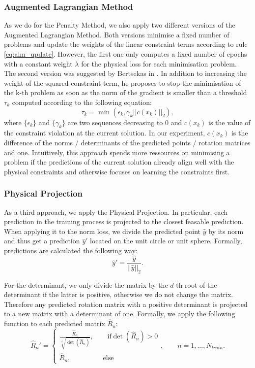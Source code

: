 \subsubsection{Augmented Lagrangian Method}
\label{exp:alm}
As we do for the Penalty Method, we also apply two different versions of the Augmented Lagrangian Method. Both versions minimise a fixed number of problems and update the weights of the linear constraint terms according to rule \eqref{eq:alm_update}. However, the first one only computes a fixed number of epochs with a constant weight $\lambda$ for the physical loss for each minimisation problem.\\
\indent The second version was suggested by Bertsekas in \cite{Yurkiewicz1985ConstrainedOA}. In addition to increasing the weight of the squared constraint term, he proposes to stop the minimisation of the k-th problem as soon as the norm of the gradient is smaller than a threshold $\tau_k$ computed according to the following equation:
\[\tau_k = \min(\epsilon_k, \gamma_k ||c(x_k)||_2), \]
where $\{\epsilon_k\}$ and $\{\gamma_k \}$ are two sequences decreasing to 0 and $c(x_k)$ is the value of the constraint violation at the current solution. In our experiment, $c(x_k)$ is the difference of the norms / determinants of the predicted points / rotation matrices and one. Intuitively, this approach spends more ressources on minimising a problem if the predictions of the current solution already align well with the physical constraints and otherwise focuses on learning the constraints first.

\subsubsection{Physical Projection}
\label{sec:phys_proj}
As a third approach, we apply the Physical Projection. In particular, each prediction in the training process is projected to the closest feasable prediction. When applying it to the norm loss, we divide the predicted point $\hat{y}$ by its norm and thus get a prediction $\hat{y}'$ located on the unit circle or unit sphere. Formally, predictions are calculated the following way:
\begin{equation}
\hat{y}' = \frac{\hat{y}}{||\hat{y}||_2}.
\end{equation}

For the determinant, we only divide the matrix by the $d$-th root of the determinant if the latter is positive, otherwise we do not change the matrix. Therefore any predicted rotation matrix with a positive determinant is projected to a new matrix with a determinant of one. Formally, we apply the following function to each predicted matrix $\hat{R}_n$:
\begin{equation}
\hat{R}_n' = \begin{cases} \frac{\hat{R}_n}{\sqrt[d]{\det(\hat{R}_n)}}, \qquad \text{if} \det(\hat{R}_n) > 0 \\ \hat{R}_n, \qquad \qquad \,\,\,\,\text{else} \end{cases}, \qquad n = 1, ..., N_{train}.
\label{eq:norm_det}
\end{equation}

